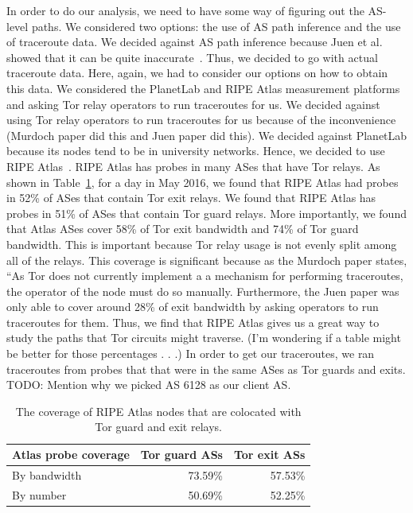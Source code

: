 In order to do our analysis, we need to have some way of figuring out the AS-level paths. 
We considered two options: the use of AS path inference and the use of traceroute data. 
We decided against AS path inference because Juen et al. showed that it can be quite
inaccurate~\cite{Juen2015a}.  Thus, we decided to go with actual traceroute data. Here,
again, we had to consider our options on how to obtain this data. We considered the
PlanetLab and RIPE Atlas measurement platforms and asking Tor relay operators to run
traceroutes for us.  We decided against using Tor relay operators to run traceroutes for
us because of the inconvenience (Murdoch paper did this and Juen paper did this). We
decided against PlanetLab because its nodes tend to be in university networks. Hence, we
decided to use RIPE Atlas~\cite{atlas}. RIPE Atlas has probes in many ASes that have Tor
relays. As shown in Table~\ref{tab:atlas-coverage}, for a day in May 2016, we found that
RIPE Atlas had probes in 52\% of ASes that contain Tor exit relays.  We found that RIPE
Atlas has probes in 51\% of ASes that contain Tor guard relays. More importantly, we found
that Atlas ASes cover 58\% of Tor exit bandwidth and 74\% of Tor guard bandwidth. This is
important because Tor relay usage is not evenly split among all of the relays. This
coverage is significant because as the Murdoch paper states, ``As Tor does not currently
implement a a mechanism for performing traceroutes, the operator of the node must do so
manually. Furthermore, the Juen paper was only able to cover around 28\% of exit bandwidth
by asking operators to run traceroutes for them.  Thus, we find that RIPE Atlas gives us a
great way to study the paths that Tor circuits might traverse. (I'm wondering if a table
might be better for those percentages .  . .) In order to get our traceroutes, we ran
traceroutes from probes that that were in the same ASes as Tor guards and exits. TODO:
Mention why we picked AS 6128 as our client AS.



\begin{table}[t]
	\caption{The coverage of RIPE Atlas nodes that are colocated with Tor guard and exit
	relays.}
	\label{tab:atlas-coverage}
	\centering
	\begin{tabular}{l|r r}
	\toprule
	\textbf{Atlas probe coverage} & \textbf{Tor guard ASs} & \textbf{Tor exit ASs} \\
	\midrule
	By bandwidth & 73.59\% & 57.53\% \\
	By number & 50.69\% & 52.25\% \\
	\bottomrule
	\end{tabular}
\end{table}

